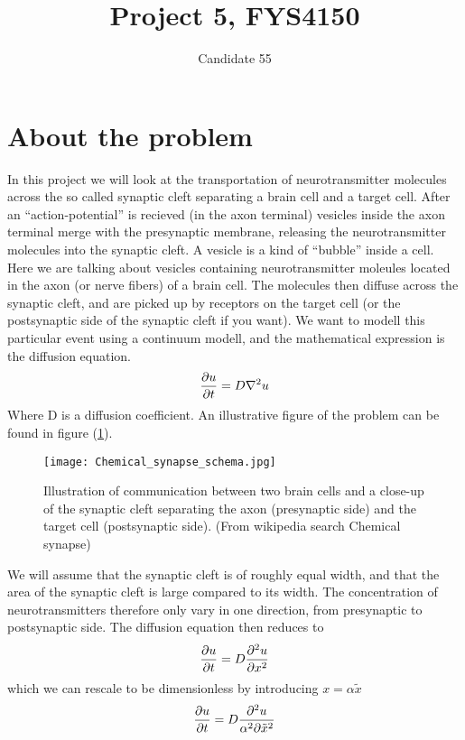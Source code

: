 \documentclass[a4paper,english, 10pt, twoside]{article}
\title{Project 5, FYS4150}
\author{Candidate 55}
\renewcommand{\d}{\partial}
\begin{document}
\maketitle
\newpage
\tableofcontents
\newpage
\section{About the problem}
In this project we will look at the transportation of neurotransmitter molecules across the so called synaptic cleft separating a 
brain cell and a target cell. After an ``action-potential'' is recieved (in the axon terminal) vesicles inside the axon terminal merge with the 
presynaptic membrane, releasing the neurotransmitter molecules into the synaptic cleft. 
A vesicle is a kind of ``bubble'' inside a cell. Here we are talking about vesicles containing neurotransmitter moleules located in the axon (or 
nerve fibers) of a brain cell. The molecules then diffuse across the synaptic cleft, and are picked up by receptors on the target cell (or the 
postsynaptic side of the synaptic cleft if you want). We want to modell this particular event using a continuum modell, and the mathematical 
expression is the diffusion equation.
\begin{equation*}
{\d u \over \d t} = D\nabla^2 u 
\end{equation*}
Where D is a diffusion coefficient. An illustrative figure of the problem can be found in figure (\ref{synapse}).
\begin{figure}[H]
 \centering
 \texttt{[image: Chemical\_synapse\_schema.jpg]}
 \caption{Illustration of communication between two brain cells and a close-up of the synaptic cleft separating the axon (presynaptic side) and
 the target cell (postsynaptic side). (From wikipedia search Chemical synapse) }
 \label{synapse}
\end{figure}
We will assume that the synaptic cleft is of roughly equal width, and that the area of the synaptic cleft is large compared to its width. The 
concentration of neurotransmitters therefore only vary in one direction, from presynaptic to postsynaptic side. The diffusion equation then reduces 
to
\begin{equation*}
 {\d u \over \d t} = D{\d^2 u \over \d x^2}
\end{equation*}
which we can rescale to be dimensionless by introducing $x = \alpha\tilde{x} $
\begin{equation*}
 {\d u \over \d t} = D{\d^2 u \over \alpha^2\d\tilde{x}^2}
\end{equation*}
\end{document}
